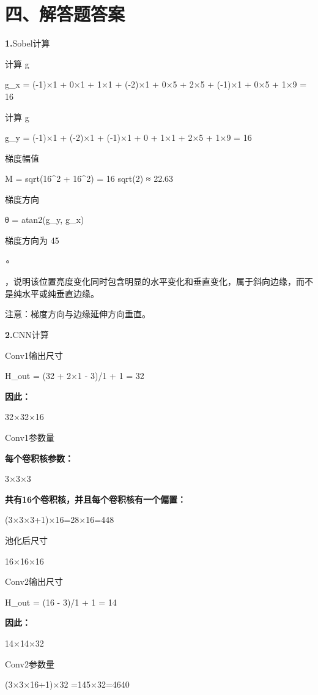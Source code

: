 \documentclass[UTF8,openany,oneside,zihao=-4,fontset=windows]{ctexbook}
\newcommand{\Question}[2]{%
  \par\Needspace{4\baselineskip}\medskip
  \noindent\textbf{\color{MVBlue}#1}\quad #2\par
}
\begin{document}
\section{四、解答题答案}
\Question{1.}{Sobel计算}
\par 计算 g
\begin{center}\small\ttfamily g\_x = (-1)×1 + 0×1 + 1×1 + (-2)×1 + 0×5 + 2×5 + (-1)×1 + 0×5 + 1×9 = 16\end{center}
\par 计算 g
\begin{center}\small\ttfamily g\_y = (-1)×1 + (-2)×1 + (-1)×1 + 0 + 1×1 + 2×5 + 1×9 = 16\end{center}
\par 梯度幅值
\begin{center}\small\ttfamily M = sqrt(16\textasciicircum{}2 + 16\textasciicircum{}2) = 16 sqrt(2) ≈ 22.63\end{center}
\par 梯度方向
\begin{center}\small\ttfamily θ = atan2(g\_y, g\_x)\end{center}
\par 梯度方向为 45
\par ∘
\par ，说明该位置亮度变化同时包含明显的水平变化和垂直变化，属于斜向边缘，而不是纯水平或纯垂直边缘。
\par 注意：梯度方向与边缘延伸方向垂直。
\Question{2.}{CNN计算}
\par Conv1输出尺寸
\begin{center}\small\ttfamily H\_out = (32 + 2×1 - 3)/1 + 1 = 32\end{center}
\par\noindent\textbf{因此：}
\par 32×32×16
\par Conv1参数量
\par\noindent\textbf{每个卷积核参数：}
\par 3×3×3
\par\noindent\textbf{共有16个卷积核，并且每个卷积核有一个偏置：}
\par (3×3×3+1)×16=28×16=448
\par 池化后尺寸
\par 16×16×16
\par Conv2输出尺寸
\begin{center}\small\ttfamily H\_out = (16 - 3)/1 + 1 = 14\end{center}
\par\noindent\textbf{因此：}
\par 14×14×32
\par Conv2参数量
\begin{center}\small\ttfamily (3×3×16+1)×32 =145×32=4640\end{center}
\end{document}
